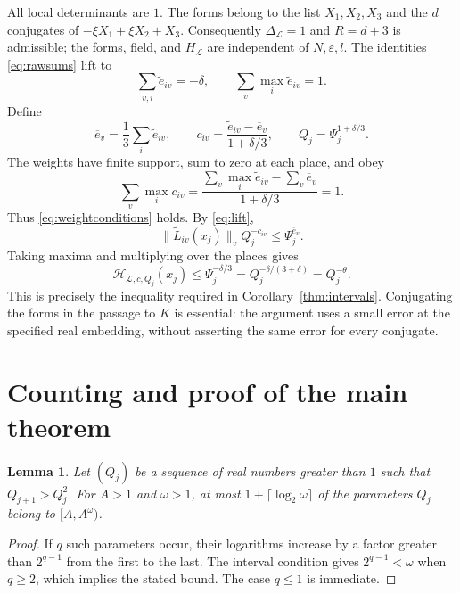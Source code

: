 \documentclass[11pt]{article}
\numberwithin{equation}{section}
\newtheorem{lemma}[theorem]{Lemma}
\theoremstyle{remark}
\newcommand{\eps}{\varepsilon}
\newcommand{\HH}{\mathcal H}
\begin{document}
All local determinants are $1$. The forms belong to the list
$X_1,X_2,X_3$ and the $d$ conjugates of
$-\xi X_1+\xi X_2+X_3$.
Consequently $\Delta_{\mathcal L}=1$ and $R=d+3$ is admissible;
the forms, field, and $H_{\mathcal L}$ are independent of $N,\eps,l$.
The identities \eqref{eq:rawsums} lift to
\[
 \sum_{v,i}\widetilde e_{iv}=-\delta,\qquad
 \sum_v\max_i\widetilde e_{iv}=1.
\]
Define
\begin{equation}\label{eq:center}
 \overline e_v=\frac13\sum_i\widetilde e_{iv},\qquad
 c_{iv}=\frac{\widetilde e_{iv}-\overline e_v}{1+\delta/3},
 \qquad Q_j=\Psi_j^{1+\delta/3}.
\end{equation}
The weights have finite support, sum to zero at each place, and obey
\[
 \sum_v\max_i c_{iv}
 =\frac{\sum_v\max_i\widetilde e_{iv}-\sum_v\overline e_v}
        {1+\delta/3}=1.
\]
Thus \eqref{eq:weightconditions} holds. By \eqref{eq:lift},
\[
 \|\widetilde L_{iv}(x_j)\|_v Q_j^{-c_{iv}}
 \le\Psi_j^{\overline e_v}.
\]
Taking maxima and multiplying over the places gives
\begin{equation}\label{eq:conversion}
 \HH_{\mathcal L,c,Q_j}(x_j)
 \le\Psi_j^{-\delta/3}
 =Q_j^{-\delta/(3+\delta)}
 =Q_j^{-\theta}.
\end{equation}
This is precisely the inequality required in
Corollary~\ref{thm:intervals}. Conjugating the forms in the passage to
$K$ is essential: the argument uses a small error at the specified
real embedding, without asserting the same error for every conjugate.

\section{Counting and proof of the main theorem}\label{sec:counting}

\begin{lemma}\label{lem:intervalcount}
Let $(Q_j)$ be a sequence of real numbers greater than $1$ such that
$Q_{j+1}>Q_j^2$. For $A>1$ and $\omega>1$, at most
$1+\lceil\log_2\omega\rceil$ of the parameters $Q_j$ belong to
$[A,A^\omega)$.
\end{lemma}
\begin{proof}
If $q$ such parameters occur, their logarithms increase by a factor
greater than $2^{q-1}$ from the first to the last. The interval
condition gives $2^{q-1}<\omega$ when $q\ge2$, which implies the
stated bound. The case $q\le1$ is immediate.
\end{proof}
\end{document}
